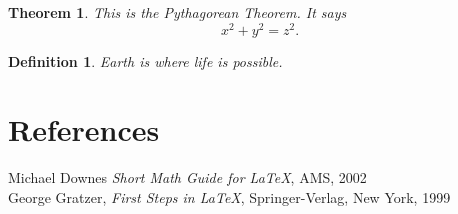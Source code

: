 \documentclass[12pt]{article}
\newtheorem{theorem}{Theorem}
\newtheorem{definition}{Definition}
\begin{document}
\begin{theorem}
    This is the Pythagorean Theorem. It says
    \begin{equation}
        x^{2}+y^{2}=z^{2}.
    \end{equation}
\end{theorem}
\begin{definition}
    Earth is where life is possible.
\end{definition}

\section{References}
Michael Downes \emph{Short Math Guide for \LaTeX}, AMS, 2002\\[0.2in]
George Gratzer, \emph{First Steps in \LaTeX}, Springer-Verlag, New York, 1999\\[0.2in]
\end{document}
